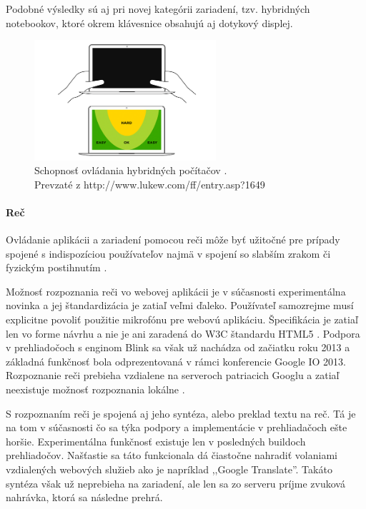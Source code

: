 Podobné výsledky \cite{mobilebooktouch} sú aj pri novej kategórii zariadení, tzv. hybridných notebookov, ktoré okrem klávesnice obsahujú aj dotykový displej.

\begin{figure}[H]
	\centering
	\includegraphics[width=0.6\textwidth]{img/tnav-touch-laptops.png}
	\caption[Schopnosť ovládania hybridných počítačov]{
		Schopnosť ovládania hybridných počítačov \cite{navigation}.\\
		Prevzaté z http://www.lukew.com/ff/entry.asp?1649}
	\label{fig: tnavlaptops}
\end{figure}



\paragraph{Reč} %

Ovládanie aplikácii a zariadení pomocou reči môže byť užitočné pre prípady spojené s indispozíciou používateľov najmä v spojení so slabším zrakom či fyzickým postihnutím \cite{SpeechRecognition}.

Možnosť rozpoznania reči vo webovej aplikácii je v súčasnosti experimentálna novinka a jej štandardizácia je zatiaľ veľmi ďaleko. Používateľ samozrejme musí explicitne povoliť použitie mikrofónu pre webovú aplikáciu. Špecifikácia je zatiaľ len vo forme návrhu a nie je ani zaradená do W3C štandardu HTML5 \cite{webspeechapi}. Podpora v prehliadočoch s enginom Blink sa však už nachádza od začiatku roku 2013 a základná funkčnosť bola odprezentovaná v rámci konferencie Google IO 2013. Rozpoznanie reči prebieha vzdialene na serveroch patriacich Googlu a zatiaľ neexistuje možnosť rozpoznania lokálne \cite{moreawesomeweb}.

S rozpoznaním reči je spojená aj jeho syntéza, alebo preklad textu na reč. Tá je na tom v súčasnosti čo sa týka podpory a implementácie v prehliadačoch ešte horšie. Experimentálna funkčnosť existuje len v posledných buildoch prehliadočov. Našťastie sa táto funkcionala dá čiastočne nahradiť volaniami vzdialených webových služieb ako je napríklad ,,Google Translate''. Takáto syntéza však už neprebieha na zariadení, ale len sa zo serveru príjme zvuková nahrávka, ktorá sa následne prehrá.

